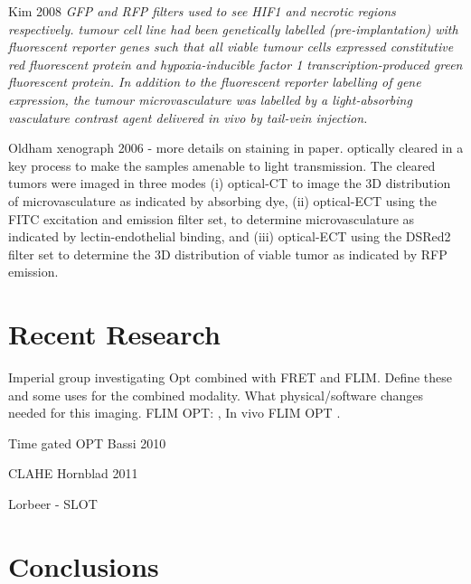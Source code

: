 \documentclass[12pt]{article}
\begin{document}
Kim 2008 \textit{GFP and RFP filters used to see HIF1 and necrotic regions respectively.
tumour cell line had been genetically labelled (pre-implantation) with fluorescent reporter genes such that all viable tumour cells expressed constitutive red fluorescent protein and hypoxia-inducible factor 1   transcription-produced   green   fluorescent   protein.   In   addition   to   the fluorescent reporter labelling of gene expression, the tumour microvasculature was labelled by a light-absorbing vasculature contrast agent delivered in vivo by tail-vein injection.
}

Oldham xenograph 2006 - more details on staining in paper.
optically cleared in a key process to make
 the samples amenable to light transmission. The cleared tumors were imaged in three modes (i)
 optical-CT to image the 3D distribution of microvasculature as indicated by absorbing dye, (ii)
 optical-ECT using the FITC excitation and emission filter set, to determine microvasculature as
 indicated by lectin-endothelial binding, and (iii) optical-ECT using the DSRed2 filter set to determine
 the 3D distribution of viable tumor as indicated by RFP emission. 



\section{Recent Research}

Imperial group investigating Opt combined with FRET and FLIM. Define these and some uses for the combined modality. What physical/software changes needed for this imaging.
FLIM OPT: \cite{McGinty:2008ix}, In vivo FLIM OPT \cite{McGinty:2011vm}.

 Time gated OPT Bassi 2010 \cite{Bassi:2010}
 
 CLAHE Hornblad 2011 \cite{Hornblad:2011fh}

Lorbeer - SLOT \cite{Lorbeer:2011}

\section{Conclusions}


\end{document}
